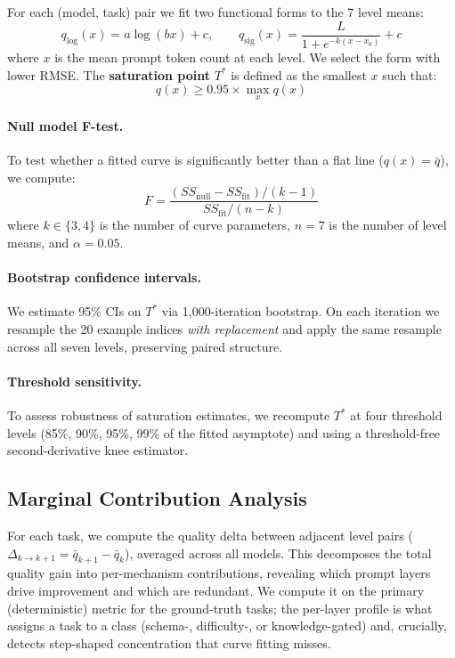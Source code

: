 For each (model, task) pair we fit two functional forms to the 7 level means:
\begin{equation}
  q_{\log}(x) = a \log(bx) + c, \qquad
  q_{\text{sig}}(x) = \frac{L}{1 + e^{-k(x - x_0)}} + c
  \label{eq:curves}
\end{equation}
where $x$ is the mean prompt token count at each level.
We select the form with lower RMSE.
The \textbf{saturation point} $T^*$ is defined as the smallest $x$ such that:
\begin{equation}
  q(x) \geq 0.95 \times \max_{x} q(x)
  \label{eq:satpoint}
\end{equation}

\paragraph{Null model F-test.}
To test whether a fitted curve is significantly better than a flat line
($q(x) = \bar{q}$), we compute:
\begin{equation}
  F = \frac{(SS_{\text{null}} - SS_{\text{fit}}) / (k - 1)}{SS_{\text{fit}} / (n - k)}
  \label{eq:ftest}
\end{equation}
where $k \in \{3, 4\}$ is the number of curve parameters, $n = 7$ is the
number of level means, and $\alpha = 0.05$.

\paragraph{Bootstrap confidence intervals.}
We estimate 95\% CIs on $T^*$ via 1,000-iteration bootstrap.
On each iteration we resample the 20 example indices \emph{with replacement}
and apply the same resample across all seven levels, preserving paired
structure.

\paragraph{Threshold sensitivity.}
To assess robustness of saturation estimates, we recompute $T^*$ at four
threshold levels (85\%, 90\%, 95\%, 99\% of the fitted asymptote) and
using a threshold-free second-derivative knee estimator.

\subsection{Marginal Contribution Analysis}
\label{sec:marginal}

For each task, we compute the quality delta between adjacent level pairs
($\Delta_{k \to k+1} = \bar{q}_{k+1} - \bar{q}_k$), averaged across all
models.
This decomposes the total quality gain into per-mechanism contributions,
revealing which prompt layers drive improvement and which are redundant.
We compute it on the primary (deterministic) metric for the ground-truth
tasks; the per-layer profile is what assigns a task to a class (schema-,
difficulty-, or knowledge-gated) and, crucially, detects step-shaped
concentration that curve fitting misses.

